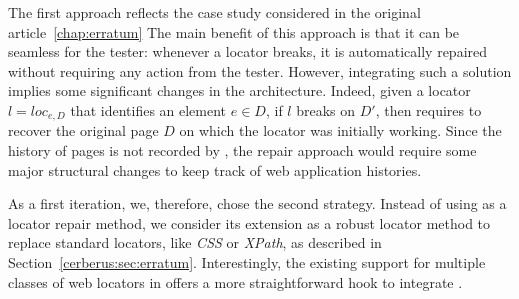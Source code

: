 The first approach reflects the case study considered in the original \erratum article~\ref{chap:erratum}
The main benefit of this approach is that it can be seamless for the tester: whenever a locator breaks, it is automatically repaired without requiring any action from the tester.
However, integrating such a solution implies some significant changes in the \cerberus architecture.
Indeed, given a locator $l = loc_{e,D}$ that identifies an element $e \in D$, if $l$ breaks on $D'$, then \erratum requires to recover the original page $D$ on which the locator was initially working.
Since the history of pages is not recorded by \cerberus, the repair approach would require some major structural changes to keep track of web application histories.

As a first iteration, we, therefore, chose the second strategy.
Instead of using \erratum as a locator repair method, we consider its extension as a robust locator method to replace standard locators, like \textit{CSS} or \textit{XPath}, as described in Section~\ref{cerberus:sec:erratum}.
Interestingly, the existing support for multiple classes of web locators in \cerberus offers a more straightforward hook to integrate \erratum.

